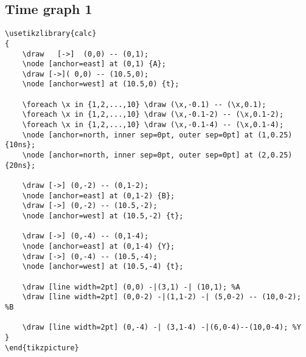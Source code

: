 \documentclass[a4paper,12pt,dvipsnames]{article}
\begin{document}
\subsection{Time graph 1}

\begin{center}
\end{center}

\begin{verbatim}
\usetikzlibrary{calc}
{
	\draw   [->]  (0,0) -- (0,1);
	\node [anchor=east] at (0,1) {A};
	\draw [->]( 0,0) -- (10.5,0);
	\node [anchor=west] at (10.5,0) {t};
	
	\foreach \x in {1,2,...,10} \draw (\x,-0.1) -- (\x,0.1);
	\foreach \x in {1,2,...,10} \draw (\x,-0.1-2) -- (\x,0.1-2);
	\foreach \x in {1,2,...,10} \draw (\x,-0.1-4) -- (\x,0.1-4);
	\node [anchor=north, inner sep=0pt, outer sep=0pt] at (1,0.25) {10ns};
	\node [anchor=north, inner sep=0pt, outer sep=0pt] at (2,0.25) {20ns};

	\draw [->] (0,-2) -- (0,1-2);
	\node [anchor=east] at (0,1-2) {B};
	\draw [->] (0,-2) -- (10.5,-2);
	\node [anchor=west] at (10.5,-2) {t};

	\draw [->] (0,-4) -- (0,1-4);
	\node [anchor=east] at (0,1-4) {Y};
	\draw [->] (0,-4) -- (10.5,-4);
	\node [anchor=west] at (10.5,-4) {t};

	\draw [line width=2pt] (0,0) -|(3,1) -| (10,1); %A
	\draw [line width=2pt] (0,0-2) -|(1,1-2) -| (5,0-2) -- (10,0-2); %B

	\draw [line width=2pt] (0,-4) -| (3,1-4) -|(6,0-4)--(10,0-4); %Y
}
\end{tikzpicture}
\end{verbatim}
\end{document}
